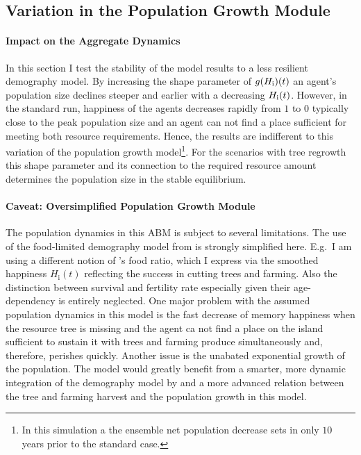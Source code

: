\FloatBarrier
\subsection{Variation in the Population Growth Module}

\paragraph{Impact on the Aggregate Dynamics}
In this section I test the stability of the model results to a less resilient demography model.
By increasing the shape parameter of $g(H_{\rm i})(t)$ an agent's population size declines steeper and earlier with a decreasing $H_{\rm i}(t)$.
However, in the standard run, happiness of the agents decreases rapidly from $1$ to $0$ typically close to the peak population size and an agent can not find a place sufficient for meeting both resource requirements.
Hence, the results are indifferent to this variation of the population growth model\footnote{In this simulation a the ensemble net population decrease sets in only $10$ years prior to the standard case.}.
For the scenarios with tree regrowth this shape parameter and its connection to the required resource amount determines the population size in the stable equilibrium.

\paragraph{Caveat: Oversimplified Population Growth Module}
The population dynamics in this ABM is subject to several limitations.
The use of the food-limited demography model from \citet{Puleston2017} is strongly simplified here.
E.g.\ I am using a different notion of \citet{Puleston2017}'s food ratio, which I express via the smoothed happiness $H_\text{i}(t)$ reflecting the success in cutting trees and farming.
Also the distinction between survival and fertility rate especially given their age-dependency is entirely neglected.
One major problem with the assumed population dynamics in this model is the fast decrease of memory happiness when the resource tree is missing and the agent ca not find a place on the island sufficient to sustain it with trees and farming produce simultaneously and, therefore, perishes quickly.
Another issue is the unabated exponential growth of the population.
The model would greatly benefit from a smarter, more dynamic integration of the demography model by \citet{Puleston2017} and a more advanced relation between the tree and farming harvest and the population growth in this model.


